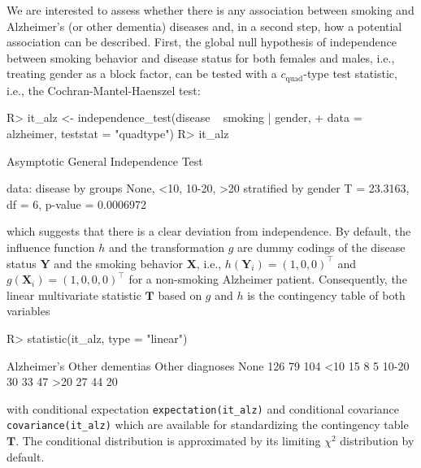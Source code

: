 \documentclass{article}
\newcommand{\Rcmd}[1]{\texttt{#1}}
\newcommand{\X}{\mathbf{X}}
\newcommand{\Y}{\mathbf{Y}}
\newcommand{\T}{\mathbf{T}}
\newenvironment{Schunk}{}{}
\begin{document}
We are interested to assess whether there is any association
between smoking and Alzheimer's (or other dementia) diseases and, in a
second step, how a potential association can be described. First,
the global null hypothesis of independence between smoking behavior and disease
status for both females and males, i.e., treating gender as a
block factor, can be tested with a $c_\text{quad}$-type test statistic, i.e., the 
Cochran-Mantel-Haenszel test:
\begin{Schunk}
\begin{Sinput}
R> it_alz <- independence_test(disease ~ smoking | gender, 
+     data = alzheimer, teststat = "quadtype")
R> it_alz
\end{Sinput}
\begin{Soutput}
	Asymptotic General Independence Test

data:  disease by
	 groups None, <10, 10-20, >20 
	 stratified by gender 
T = 23.3163, df = 6, p-value = 0.0006972
\end{Soutput}
\end{Schunk}
which suggests that there is a clear deviation from independence. 
By default, the influence function $h$ and the transformation $g$ 
are dummy codings of the disease status $\Y$ and the smoking behavior $\X$, 
i.e., $h(\Y_i) = (1, 0, 0)^\top$ 
and $g(\X_i) = (1, 0, 0 ,0)^\top$ for a non-smoking Alzheimer patient. 
Consequently, the linear multivariate statistic $\T$ based on $g$ and $h$ 
is the contingency table of both variables 
\begin{Schunk}
\begin{Sinput}
R> statistic(it_alz, type = "linear")
\end{Sinput}
\begin{Soutput}
      Alzheimer's Other dementias Other diagnoses
None          126              79             104
<10            15               8               5
10-20          30              33              47
>20            27              44              20
\end{Soutput}
\end{Schunk}
with conditional expectation \Rcmd{expectation(it\_alz)} and conditional
covariance \Rcmd{covariance(it\_alz)} which are available for standardizing
the contingency table $\T$. The conditional distribution is approximated by
its limiting $\chi^2$ distribution by default. 
\end{document}
